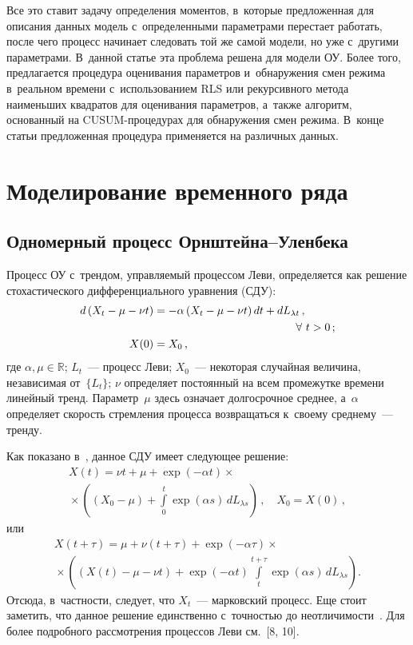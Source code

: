 \begin{multicols}{2}
Все это ставит задачу определения моментов, в~которые предложенная для описания 
данных модель с~определенными параметрами перестает работать, после чего процесс 
начинает следовать той же самой модели, но уже с~другими параметрами. В~данной 
статье эта проблема решена для модели\linebreak
 ОУ. Более того, предлагается процедура 
оценивания параметров  и~обнаружения смен режима в~реаль\-ном времени 
с~использованием RLS или рекурсивного метода наименьших квадратов для оценивания 
параметров, а~также алгоритм, основанный на CUSUM-про\-це\-ду\-рах для обнаружения 
смен режима. В~конце статьи предложенная процедура применяется на различных 
данных.


\section{Моделирование временного ряда}

        \subsection {Одномерный процесс Орнштейна--Уленбека}

       Процесс ОУ с~трендом, управляемый процессом Леви, 
определяется как решение стохастического дифференциального уравнения  (СДУ):       
\begin{align*}
d\left(X_t -\mu -  \nu t\right)& = -\alpha\left(X_t - \mu - \nu 
t\right) dt +  dL_{\lambda t}\,,\\ 
&\hspace{45mm}\forall\  t>0\,;  \\
X(0) &= X_0\,,  
       \end{align*}
         где $\alpha, \mu \in \mathbb{R}$; $L_t$~--- процесс Леви; $X_0$~--- 
некоторая случайная величина, независимая от~$\{L_t\}$; $\nu$ определяет 
постоянный на всем промежутке времени линейный тренд. Параметр~$\mu$ здесь 
означает долгосрочное среднее, а~$\alpha$ определяет скорость стремления 
процесса возвращаться к~своему среднему~--- тренду.

Как показано в~\cite{Protter}, данное СДУ имеет сле\-ду\-ющее решение:
\begin{multline*}
X(t) =\nu t + \mu + \exp\left(-\alpha t\right) \times{}\\
{}\times
\left(
\left(X_0 - \mu \right)+ \int\limits_0^t\exp(\alpha  s)\,dL_{\lambda s}\right)\,, 
\quad X_0 = X(0)\,,
\end{multline*}
или
\begin{multline}
X(t + \tau) =\mu +\nu  (t + \tau) +   \exp
\left(-\alpha \tau\right)\times{}\\
\!\!{}\times\! \left(\!\!
(X(t) - \mu - \nu  t) + \exp(- \alpha t)\!\int\limits_t^{t + \tau}\!\!
\exp(\alpha s)\,dL_{\lambda s}\!\right).\!\!\!\!
\label{explicit_ou}
\end{multline}
Отсюда, в~частности, следует, что $X_t$~--- марковский процесс. Еще стоит 
заметить, что данное решение единственно с~точностью до неотличимости~\cite{sato}. 
Для более подробного рассмотрения процессов Леви см.~[8, 10].


\end{multicols}
